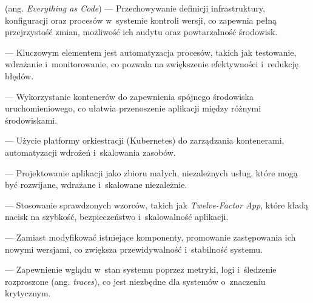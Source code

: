\begin{description}[font=\bfseries]
    \item[Wszystko jako kod] (ang. \textit{Everything as Code}) --- Przechowywanie definicji infrastruktury, konfiguracji oraz procesów w~systemie kontroli wersji, co zapewnia pełną przejrzystość zmian, możliwość ich audytu oraz powtarzalność środowisk.
    \item[Automatyzacja] --- Kluczowym elementem jest automatyzacja procesów, takich jak testowanie, wdrażanie i~monitorowanie, co pozwala na zwiększenie efektywności i~redukcję błędów.
    \item[Konteneryzacja] --- Wykorzystanie kontenerów do zapewnienia spójnego środowiska uruchomieniowego, co ułatwia przenoszenie aplikacji między różnymi środowiskami.
    \item[Orkiestracja] --- Użycie platformy orkiestracji (Kubernetes) do zarządzania kontenerami, automatyzacji wdrożeń i~skalowania zasobów.
    \item[Architektura mikroserwisów] --- Projektowanie aplikacji jako zbioru małych, niezależnych usług, które mogą być rozwijane, wdrażane i~skalowane niezależnie.
    \item[Wzorce projektowe] --- Stosowanie sprawdzonych wzorców, takich jak \textit{Twelve-Factor App}, które kładą nacisk na szybkość, bezpieczeństwo i~skalowalność aplikacji.
    \item[Niezmienna infrastruktura] --- Zamiast modyfikować istniejące komponenty, promowanie zastępowania ich nowymi wersjami, co zwiększa przewidywalność i~stabilność systemu.
    \item[Obserwowalność] --- Zapewnienie wglądu w~stan systemu poprzez metryki, logi i~śledzenie rozproszone (ang. \textit{traces}), co jest niezbędne dla systemów o~znaczeniu krytycznym.
\end{description}